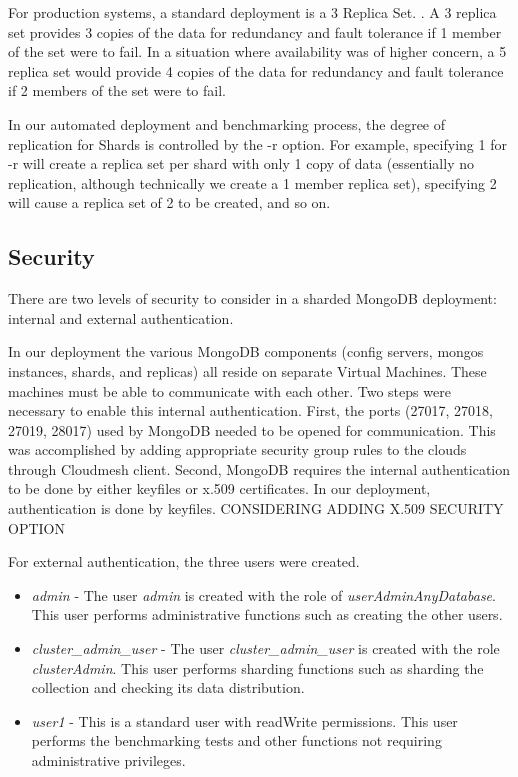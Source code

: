 \documentclass[9pt,twocolumn,twoside]{styles/osajnl}
\begin{document}
For production systems, a standard deployment is a 3 Replica Set.  \cite{www-mongoRepDep}.  A 3 replica set provides 3 copies of the data for redundancy and fault tolerance if 1 member of the set were to fail.  In a situation where availability was of higher concern, a 5 replica set would provide 4 copies of the data for redundancy and fault tolerance if 2 members of the set were to fail.

In our automated deployment and benchmarking process, the degree of replication for Shards is controlled by the -r option. For example, specifying 1 for -r will create a replica set per shard with only 1 copy of data (essentially no replication, although technically we create a 1 member replica set), specifying 2 will cause a replica set of 2 to be created, and so on.

\subsection{Security}

There are two levels of security to consider in a sharded MongoDB deployment: internal and external authentication.

In our deployment the various MongoDB components (config servers, mongos instances, shards, and replicas) all reside on separate Virtual Machines.  These machines must be able to communicate with each other.  Two steps were necessary to enable this internal authentication.  First, the ports (27017, 27018, 27019, 28017) used by MongoDB needed to be opened for communication.  This was accomplished by adding appropriate security group rules to the clouds through Cloudmesh client.  Second, MongoDB requires the internal authentication to be done by either keyfiles or x.509 certificates.  \cite{www-mongoAuth}  In our deployment, authentication is done by keyfiles. CONSIDERING ADDING X.509 SECURITY OPTION

For external authentication, the three users were created.

\vspace{-\topsep}
\begin{itemize}
\item \emph{admin} - The user \emph{admin} is created with the role of \emph{userAdminAnyDatabase}.  This user performs administrative functions such as creating the other users.
\item \emph{cluster\_admin\_user} - The user \emph{cluster\_admin\_user} is created with the role \emph{clusterAdmin}. This user performs sharding functions such as sharding the collection and checking its data distribution.
\item \emph{user1} - This is a standard user with readWrite permissions.  This user performs the benchmarking tests and other functions not requiring administrative privileges.
\end{itemize}
\vspace{-\topsep}
\end{document}
